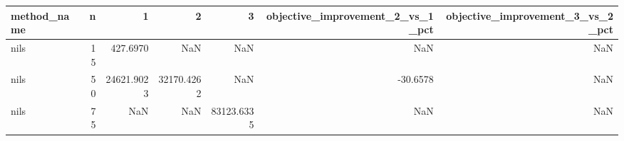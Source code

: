 \begin{tabular}{lrrrrrr}
\toprule
method_name & n & 1 & 2 & 3 & objective_improvement_2_vs_1_pct & objective_improvement_3_vs_2_pct \\
\midrule
nils & 15 & 427.6970 & NaN & NaN & NaN & NaN \\
nils & 50 & 24621.9023 & 32170.4262 & NaN & -30.6578 & NaN \\
nils & 75 & NaN & NaN & 83123.6335 & NaN & NaN \\
\bottomrule
\end{tabular}

